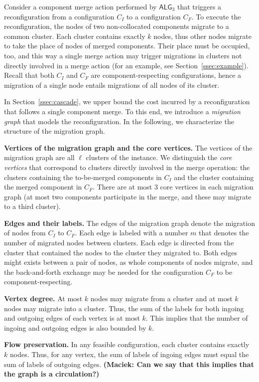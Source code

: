 \documentclass[manuscript,screen=true, review, anonymous]{acmart}
\newcommand{\TAlg}{{\ensuremath{\textsf{ALG}_{3}}}\xspace}
\newcommand\maciek[1]{\color{brown}\textbf{(Maciek: #1)}\color{black}}
\begin{document}
Consider a component merge action performed by \TAlg that triggers a reconfiguration from a configuration $C_I$ to a configuration $C_F$.
To execute the reconfiguration, the nodes of two non-collocated components migrate to a common cluster.
Each cluster contains exactly $k$ nodes, thus other nodes migrate to take the place of nodes of merged components.
Their place must be occupied, too, and this way a single merge action may trigger migrations in clusters not directly involved in a merge action (for an example, see Section~\ref{ssec:example}). 
Recall that both $C_I$ and $C_F$ are component-respecting configurations, hence a migration of a single node entails migrations of all nodes of its cluster.

In Section~\ref{ssec:cascade}, we upper bound the cost incurred by a reconfiguration that follows a single component merge.
To this end, we introduce a \emph{migration graph} that models the reconfiguration.
In the following, we characterize the structure of the migration graph.

\noindent
\textbf{Vertices of the migration graph and the core vertices.}
The vertices of the migration graph are all $\ell$ clusters of the instance.
We distinguish the \emph{core vertices} that correspond to clusters directly involved in the merge operation: the clusters containing the to-be-merged components in $C_I$ and the cluster containing the merged component in $C_F$.
There are at most $3$ core vertices in each migration graph (at most two components participate in the merge, and these may migrate to a third cluster).

\noindent
\textbf{Edges and their labels.}
The edges of the migration graph denote the migration of nodes from $C_I$ to $C_F$.
Each edge is labeled with a number $m$ that denotes the number of migrated nodes between clusters.
Each edge is directed from the cluster that contained the nodes to the cluster they migrated to.
Both edges might exists between a pair of nodes, as whole components of nodes migrate, and the back-and-forth exchange may be needed for the configuration $C_F$ to be component-respecting.

\noindent
\textbf{Vertex degree.}
At most $k$ nodes may migrate from a cluster and at most $k$ nodes may migrate into a cluster.
Thus, the sum of the labels for both ingoing and outgoing edges of each vertex is at most $k$.
This implies that the number of ingoing and outgoing edges is also bounded by $k$.

\noindent
\textbf{Flow preservation.}
In any feasible configuration, each cluster contains exactly $k$ nodes.
Thus, for any vertex, the sum of labels of ingoing edges must equal the sum of labels of outgoing edges.
\maciek{Can we say that this implies that the graph is a circulation?}
\end{document}
